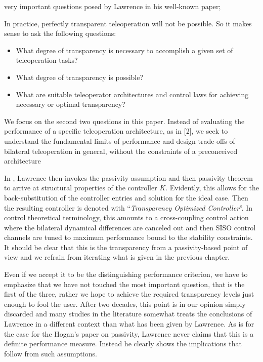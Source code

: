 very important questions posed by Lawrence in his well-known paper;
\begin{displayquote}
In practice, perfectly transparent teleoperation will not be possible. So it makes sense to ask the following questions:
\begin{itemize}
	\item What degree of transparency is necessary to accomplish a given set of teleoperation tasks? 
	\item What degree of transparency is possible?
	\item What are suitable teleoperator architectures and control laws for achieving necessary or optimal transparency?
\end{itemize}
We focus on the second two questions in this paper. Instead of evaluating the performance of a specific teleoperation architecture,
as in [2], we seek to understand the fundamental limits of performance and design trade-offs of bilateral teleoperation in
general, without the constraints of a preconceived architecture
\end{displayquote}
In \cite{lawrence}, Lawrence then invokes the passivity assumption and then passivity theorem to arrive at structural 
properties of the controller $K$. Evidently, this allows for the back-substitution of the controller entries and solution
for the ideal case. Then the resulting controller is denoted with \enquote{\emph{Transparency Optimized Controller}}. In 
control theoretical terminology, this amounts to a cross-coupling control action where the bilateral dynamical differences
are canceled out and then SISO control channels are tuned to maximum performance bound to the stability constraints. It 
should be clear that this is the transparency from a passivity-based point of view and we refrain from iterating 
what is given in the previous chapter. 

Even if we accept it to be the distinguishing performance criterion, we have to emphasize that we have not touched the most 
important question, that is the first of the three, rather we hope to achieve the required transparency levels just enough 
to fool the user. After two decades, this point is in our opinion simply discarded and many studies in the literature somewhat 
treats the conclusions of Lawrence in a different context than what has been given by Lawrence. As is for the case for the 
Hogan's paper on passivity, Lawrence never claims that this is a definite performance measure. Instead he clearly shows the 
implications that follow from such assumptions. 


